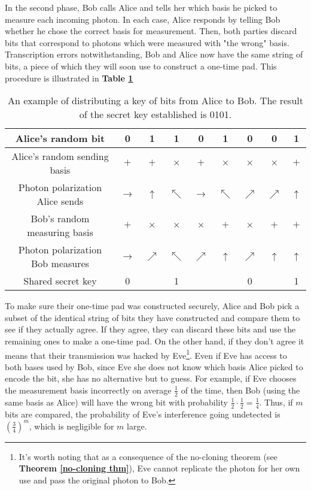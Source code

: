 In the second phase, Bob calls Alice and tells her which basis he picked to measure each incoming photon. In each case, Alice responds by telling Bob whether he chose the correct basis for measurement. Then, both parties discard bits that correspond to photons which were measured with "the wrong" basis. Transcription errors notwithstanding, Bob and Alice now have the same string of bits, a piece of which they will soon use to construct a one-time pad.  This procedure is illustrated in \textbf{Table \ref{tab:bb84 protocol example}}

\begin{table}[]
\centering
\begin{tabular}{|c|c|c|c|c|c|c|c|c|}
\hline
Alice's random bit & 0 & 1 & 1 & 0 & 1 & 0 & 0 & 1 \\ \hline
Alice's random sending basis & $+$ & $+$ & $\times$ & $+$ & $\times$ & $\times$ & $\times$ & $+$ \\ \hline
Photon polarization Alice sends & $\rightarrow$ & $\uparrow$ & $\nwarrow$ & $\rightarrow$ & $\nwarrow$ & $\nearrow$ & $\nearrow$ & $\uparrow$ \\ \hline
Bob's random measuring basis & $+$ & $\times$ & $\times$ & $\times$ & $+$ & $\times$ & $+$ & $+$ \\ \hline
Photon polarization Bob measures & $\rightarrow$ & $\nearrow$ & $\nwarrow$ & $\nearrow$ & $\uparrow$ & $\nearrow$ & $\uparrow$ & $\uparrow$ \\ \hline
Shared secret key & 0 &  & 1 &  &  & 0 &  & 1 \\ \hline
\end{tabular}
\caption{An example of distributing a key of bits from Alice to Bob. The result of the secret key established is 0101.}
\label{tab:bb84 protocol example}
\end{table}


To make sure their one-time pad was constructed securely, Alice and Bob pick a subset of the identical string of bits they have constructed and compare them to see if they actually agree. If they agree, they can discard these bits and use the remaining ones to make a one-time pad. On the other hand, if they don't agree it means that their transmission was hacked by Eve\footnote{It's worth noting that as a consequence of the no-cloning theorem (see \textbf{Theorem \ref{no-cloning thm}}), Eve cannot replicate the photon for her own use and pass the original photon to Bob.}.  Even if Eve has access to both bases used by Bob, since Eve she does not know which basis Alice picked to encode the bit, she has no alternative but to guess. For example, if Eve chooses the measurement basis incorrectly on average $\frac{1}{2}$ of the time, then Bob (using the same basis as Alice) will have the wrong bit with probability $\frac{1}{2} \cdot \frac{1}{2}=\frac{1}{4}$. Thus, if $m$ bits are compared, the probability of Eve's interference  going undetected is $(\frac{3}{4})^m$, which is negligible for $m$ large.

